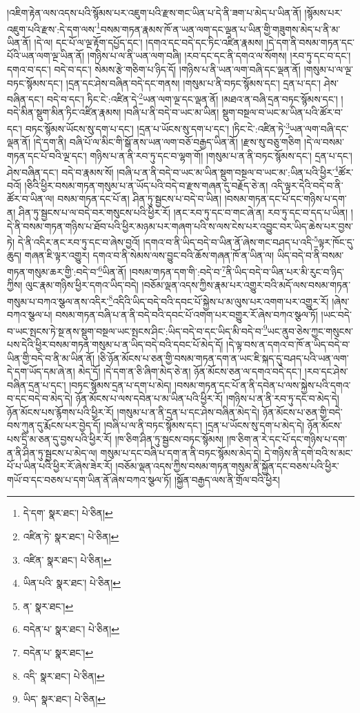 །འཇིག་རྟེན་ལས་འདས་པའི་སྙོམས་པར་འཇུག་པའི་རྫས་གང་ཡིན་པ་དེ་ནི་ཟག་པ་མེད་པ་ཡིན་ནོ། །སྙོམས་པར་འཇུག་པའི་རྫས་:དེ་དག་ལས་\footnote{དེ་དག་  སྣར་ཐང་།  པེ་ཅིན། }བསམ་གཏན་རྣམས་ཁོ་ན་ཡན་ལག་དང་ལྡན་པ་ཡིན་གྱི་གཟུགས་མེད་པ་ནི་མ་ཡིན་ནོ། །དེ་ལ། དང་པོ་ལ་ལྔ་རྟོག་དཔྱོད་དང་། །དགའ་དང་བདེ་དང་ཏིང་འཛིན་རྣམས། །དེ་དག་ནི་བསམ་གཏན་དང་པོའི་ཡན་ལག་ལྔ་ཡིན་ནོ། །གཉིས་པ་ལ་ནི་ཡན་ལག་བཞི། །རབ་དང་དང་ནི་དགའ་ལ་སོགས། །རབ་ཏུ་དང་བ་དང་། དགའ་བ་དང་། བདེ་བ་དང་། སེམས་རྩེ་གཅིག་པ་ཉིད་དོ། །གཉིས་པ་ནི་ཡན་ལག་བཞི་དང་ལྡན་ནོ། །གསུམ་པ་ལ་ལྔ་བཏང་སྙོམས་དང་། །དྲན་དང་ཤེས་བཞིན་བདེ་དང་གནས། །གསུམ་པ་ནི་བཏང་སྙོམས་དང་། དྲན་པ་དང་། ཤེས་བཞིན་དང་། བདེ་བ་དང་། ཏིང་ངེ་:འཛིན་དེ་\footnote{འཛིན་ཏེ་  སྣར་ཐང་།  པེ་ཅིན། }ཡན་ལག་ལྔ་དང་ལྡན་ནོ། །མཐའ་ན་བཞི་དྲན་བཏང་སྙོམས་དང་། །
བདེ་མིན་སྡུག་མིན་ཏིང་འཛིན་རྣམས། །བཞི་པ་ནི་བདེ་བ་ཡང་མ་ཡིན། སྡུག་བསྔལ་བ་ཡང་མ་ཡིན་པའི་ཚོར་བ་དང་། བཏང་སྙོམས་ཡོངས་སུ་དག་པ་དང་། །དྲན་པ་ཡོངས་སུ་དག་པ་དང་། །ཏིང་ངེ་:འཛིན་ཏེ་\footnote{འཛིན་  སྣར་ཐང་།  པེ་ཅིན། }ཡན་ལག་བཞི་དང་ལྡན་ནོ། །དེ་དག་ནི། བཞི་པོ་ལ་མིང་གི་སྒོ་ནས་ཡན་ལག་བཅོ་བརྒྱད་ཡིན་ནོ། །རྫས་སུ་བཅུ་གཅིག །དེ་ལ་བསམ་གཏན་དང་པོ་བའི་ལྔ་དང་། གཉིས་པ་ན་ནི་རབ་ཏུ་དང་བ་ལྷག་གོ། །གསུམ་པ་ན་ནི་བཏང་སྙོམས་དང་། དྲན་པ་དང་། ཤེས་བཞིན་དང་། བདེ་བ་རྣམས་སོ། །བཞི་པ་ན་ནི་བདེ་བ་ཡང་མ་ཡིན་སྡུག་བསྔལ་བ་ཡང་མ་:ཡིན་པའི་ཕྱིར་\footnote{ཡིན་པའི་  སྣར་ཐང་།  པེ་ཅིན། }ཚོར་བའོ། །ཅིའི་ཕྱིར་བསམ་གཏན་གསུམ་པ་ན་ཡོད་པའི་བདེ་བ་རྫས་གཞན་དུ་བརྗོད་ཅེ་ན། འདི་ལྟར་དེའི་བདེ་བ་ནི་ཚོར་བ་ཡིན་ལ། བསམ་གཏན་དང་པོ་ན། ཤིན་ཏུ་སྦྱངས་པ་བདེ་བ་ཡིན། །བསམ་གཏན་དང་པོ་དང་གཉིས་པ་དག་ན། ཤིན་ཏུ་སྦྱངས་པ་ལ་བདེ་བར་གསུངས་པའི་ཕྱིར་རོ། །ནང་རབ་ཏུ་དང་བ་གང་ཞེ་ན། རབ་ཏུ་དང་བ་དད་པ་ཡིན། །དེ་ནི་བསམ་གཏན་གཉིས་པ་ཐོབ་པའི་ཕྱིར་མཉམ་པར་གཞག་པའི་ས་ལས་ངེས་པར་འབྱུང་བར་ཡིད་ཆེས་པར་བྱས་ཏེ། དེ་ནི་འདིར་ནང་རབ་ཏུ་དང་བ་ཞེས་བྱའོ། །དགའ་བ་ནི་ཡིད་བདེ་བ་ཡིན་ནོ་ཞེས་གང་བཤད་པ་འདི་\footnote{ན་  སྣར་ཐང་། }ལྟར་ཁོང་དུ་ཆུད། གཞན་ཇི་ལྟར་འགྱུར། དགའ་བ་ནི་སེམས་ལས་བྱུང་བའི་ཆོས་གཞན་ཁོ་ན་ཡིན་ལ། ཡིད་བདེ་བ་ནི་བསམ་གཏན་གསུམ་ཆར་གྱི་:བདེ་བ་\footnote{བདེན་པ་  སྣར་ཐང་།  པེ་ཅིན། }ཡིན་ནོ། །བསམ་གཏན་དག་གི་:བདེ་བ་\footnote{བདེན་པ་  སྣར་ཐང་། }ནི་ཡིད་བདེ་བ་ཡིན་པར་མི་རུང་བ་ཉིད་ཀྱིས། ལུང་རྣམ་གཉིས་ཕྱིར་དགའ་ཡིད་བདེ། །བཅོམ་ལྡན་འདས་ཀྱིས་རྣམ་པར་འགྱུར་བའི་མདོ་ལས་བསམ་གཏན་གསུམ་པ་བཀའ་སྩལ་ནས་འདིར་\footnote{འདི་  སྣར་ཐང་།  པེ་ཅིན། }འདིའི་ཡིད་བདེ་བའི་དབང་པོ་སྐྱེས་པ་མ་ལུས་པར་འགག་པར་འགྱུར་རོ། །ཞེས་བཀའ་སྩལ་པ། བསམ་གཏན་བཞི་པ་ན་ནི་བདེ་བའི་དབང་པོ་འགག་པར་བགྱུར་རོ་ཞེས་བཀའ་སྩལ་ཏོ། །ཡང་བདེ་བ་ཡང་སྤངས་ཏེ་སྔ་ནས་སྡུག་བསྔལ་ཡང་སྤངས་ཤིང་:ཡིད་བདེ་བ་དང་ཡིད་མི་བདེ་བ་\footnote{ཡིད་  སྣར་ཐང་།  པེ་ཅིན། }ཡང་ནུབ་ཅེས་ཀྱང་གསུངས་པས་དེའི་ཕྱིར་བསམ་གཏན་གསུམ་པ་ན་ཡིད་བདེ་བའི་དབང་པོ་མེད་དོ། །དེ་ལྟ་བས་ན་དགའ་བ་ཁོ་ན་ཡིད་བདེ་བ་ཡིན་གྱི་བདེ་བ་ནི་མ་ཡིན་ནོ། །ཅི་ཉོན་མོངས་པ་ཅན་གྱི་བསམ་གཏན་དག་ན་ཡང་ཇི་སྐད་དུ་བཤད་པའི་ཡན་ལག་དེ་དག་ཡོད་དམ་ཞེ་ན། མེད་དོ། །དེ་དག་ན་ཅི་ཞིག་མེད་ཅེ་ན། ཉོན་མོངས་ཅན་ལ་དགའ་བདེ་དང་། །རབ་དང་ཤེས་བཞིན་དྲན་པ་དང་། །བཏང་སྙོམས་དྲན་པ་དག་པ་མེད། །བསམ་གཏན་དང་པོ་ན་ནི་དབེན་པ་ལས་སྐྱེས་པའི་དགའ་བ་དང་བདེ་བ་མེད་དེ། ཉོན་མོངས་པ་ལས་དབེན་པ་མ་ཡིན་པའི་ཕྱིར་རོ། །གཉིས་པ་ན་ནི་རབ་ཏུ་དང་བ་མེད་དེ། ཉོན་མོངས་པས་རྙོགས་པའི་ཕྱིར་རོ། །གསུམ་པ་ན་ནི་དྲན་པ་དང་ཤེས་བཞིན་མེད་དེ། ཉོན་མོངས་པ་ཅན་གྱི་བདེ་བས་ཀུན་དུ་རྨོངས་པར་བྱེད་དོ། །བཞི་པ་ལ་ནི་བཏང་སྙོམས་དང་། །དྲན་པ་ཡོངས་སུ་དག་པ་མེད་དེ། ཉོན་མོངས་པས་དྲི་མ་ཅན་དུ་བྱས་པའི་ཕྱིར་རོ། །ཁ་ཅིག་ཤིན་ཏུ་སྦྱངས་བཏང་སྙོམས། །ཁ་ཅིག་ན་རེ་དང་པོ་དང་གཉིས་པ་དག་ན་ནི་ཤིན་ཏུ་སྦྱངས་པ་མེད་ལ། གསུམ་པ་དང་བཞི་པ་དག་ན་ནི་བཏང་སྙོམས་མེད་དེ། དེ་གཉིས་ནི་དགེ་བའི་ས་མང་པོ་པ་ཡིན་པའི་ཕྱིར་རོ་ཞེས་ཟེར་རོ། །བཅོམ་ལྡན་འདས་ཀྱིས་བསམ་གཏན་གསུམ་ནི་སྐྱོན་དང་བཅས་པའི་ཕྱིར་གཡོ་བ་དང་བཅས་པ་དག་ཡིན་ནོ་ཞེས་བཀའ་སྩལ་ཏོ། །སྐྱོན་བརྒྱད་ལས་ནི་གྲོལ་བའི་ཕྱིར། 